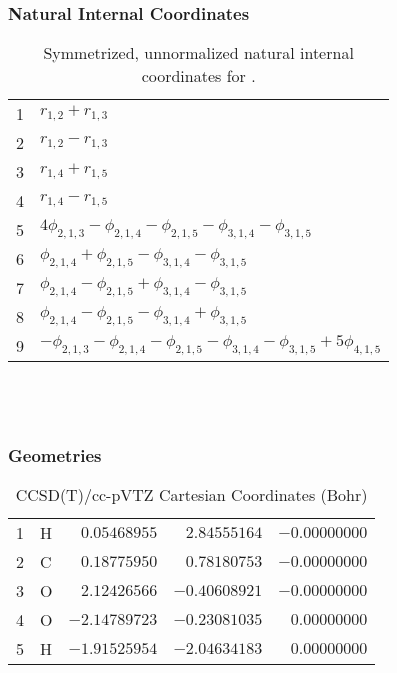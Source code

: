 \documentclass[10pt,oneside]{article}
\begin{document}
\subsubsection*{Natural Internal Coordinates}
\begin{table}[h!]
\centering
\caption{Symmetrized, unnormalized natural internal coordinates for .}
\small
\begin{tabular}{ll}
  1   & $r_{1,2} + r_{1,3}$ \\
  2   & $r_{1,2} - r_{1,3}$ \\
  3   & $r_{1,4} + r_{1,5}$ \\
  4   & $r_{1,4} - r_{1,5}$ \\
  5   & $4\phi_{2,1,3} - \phi_{2,1,4} - \phi_{2,1,5} - \phi_{3,1,4} - \phi_{3,1,5}$ \\
  6   & $\phi_{2,1,4} + \phi_{2,1,5} - \phi_{3,1,4} - \phi_{3,1,5}$ \\
  7   & $\phi_{2,1,4} - \phi_{2,1,5} + \phi_{3,1,4} - \phi_{3,1,5}$ \\
  8   & $\phi_{2,1,4} - \phi_{2,1,5} - \phi_{3,1,4} + \phi_{3,1,5}$ \\
  9   & $-\phi_{2,1,3} - \phi_{2,1,4} - \phi_{2,1,5} - \phi_{3,1,4} - \phi_{3,1,5} + 5\phi_{4,1,5}$ \\
\end{tabular}
\end{table}

\clearpage

\subsection{\ \ \ }

\subsubsection*{Geometries}
\begin{table}[h!]
\centering
\caption{CCSD(T)/cc-pVTZ Cartesian Coordinates (Bohr)}
\begin{tabular}{llrrr}
1  & H  & $ 0.05468955$ & $ 2.84555164$ & $-0.00000000$ \\
2  & C  & $ 0.18775950$ & $ 0.78180753$ & $-0.00000000$ \\
3  & O  & $ 2.12426566$ & $-0.40608921$ & $-0.00000000$ \\
4  & O  & $-2.14789723$ & $-0.23081035$ & $ 0.00000000$ \\
5  & H  & $-1.91525954$ & $-2.04634183$ & $ 0.00000000$ \\
\end{tabular}
\end{table}
\end{document}
